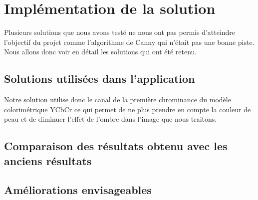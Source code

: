 \section{Implémentation de la solution}
Plusieurs solutions que nous avons testé ne nous ont pas permis d'atteindre l'objectif du projet comme 
l'algorithme de Canny qui n'était pas une bonne piste. Nous allons donc voir en détail les solutions qui ont
été retenu.

\subsection{Solutions utilisées dans l'application}
Notre solution utilise donc le canal de la première chrominance du modèle colorimétrique YCbCr ce qui permet 
de ne plus prendre en compte la couleur de peau et de diminuer l'effet de l'ombre dans l'image que nous traitons.\\

\subsection{Comparaison des résultats obtenu avec les anciens résultats}

\subsection{Améliorations envisageables}

